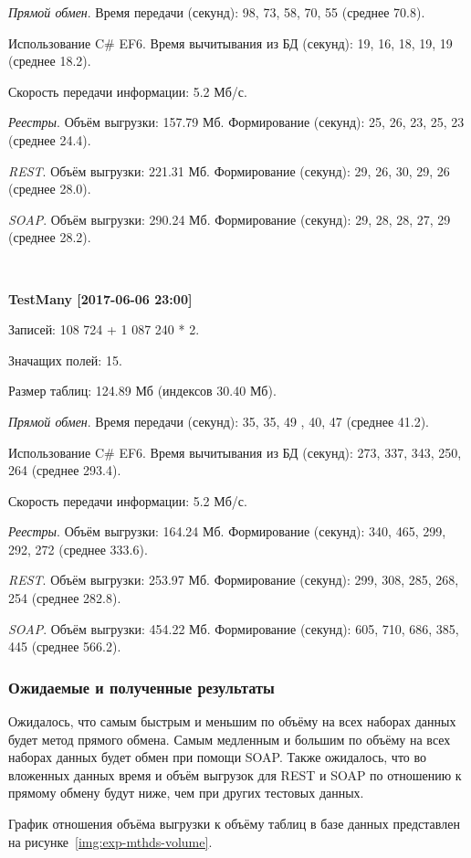 \textit{Прямой обмен}.
Время передачи (секунд): 98, 73, 58, 70, 55 (среднее 70.8).

Использование C\# EF6.
Время вычитывания из БД (секунд): 19, 16, 18, 19, 19 (среднее 18.2).

Скорость передачи информации: 5.2 Мб/с.
	
\textit{Реестры}.
Объём выгрузки: 157.79 Мб.
Формирование (секунд): 25, 26, 23, 25, 23 (среднее 24.4).

\textit{REST}.
Объём выгрузки: 221.31 Мб.
Формирование (секунд): 29, 26, 30, 29, 26 (среднее 28.0).

\textit{SOAP}.
Объём выгрузки: 290.24 Мб.
Формирование (секунд): 29, 28, 28, 27, 29 (среднее 28.2).

~

\textbf{TestMany [2017-06-06 23:00]}

Записей: 108 724 + 1 087 240 * 2.

Значащих полей: 15.

Размер таблиц: 124.89 Мб (индексов 30.40 Мб).

\textit{Прямой обмен}.
Время передачи (секунд): 35, 35, 49 , 40, 47 (среднее 41.2).

Использование C\# EF6.
Время вычитывания из БД (секунд): 273, 337, 343, 250, 264 (среднее 293.4).

Скорость передачи информации: 5.2 Мб/с.

\textit{Реестры}.
Объём выгрузки: 164.24 Мб.
Формирование (секунд): 340, 465, 299, 292, 272 (среднее 333.6).

\textit{REST}.
Объём выгрузки: 253.97 Мб.
Формирование (секунд): 299, 308, 285, 268, 254 (среднее 282.8).

\textit{SOAP}.
Объём выгрузки: 454.22 Мб.
Формирование (секунд): 605, 710, 686, 385, 445 (среднее 566.2).

\subsubsection*{Ожидаемые и полученные результаты}

Ожидалось, что самым быстрым и меньшим по объёму на всех наборах данных будет метод прямого обмена.
Самым медленным и большим по объёму на всех наборах данных будет обмен при помощи SOAP.
Также ожидалось, что во вложенных данных время и объём выгрузок для REST и SOAP по отношению к прямому обмену будут ниже, чем при других тестовых данных.

График отношения объёма выгрузки к объёму таблиц в базе данных представлен на рисунке~\ref{img:exp-mthds-volume}.

